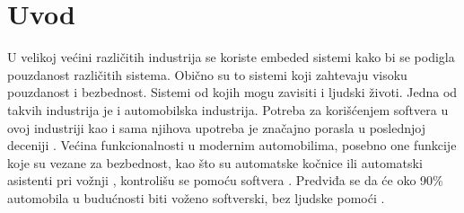 \documentclass{article}
\begin{document}
\section{Uvod}

U velikoj većini različitih industrija se koriste embeded sistemi kako bi se podigla pouzdanost različitih sistema. Obično su to sistemi koji zahtevaju visoku pouzdanost i bezbednost. Sistemi od kojih mogu zavisiti i ljudski životi. Jedna od takvih industrija je i automobilska industrija. Potreba za korišćenjem softvera u ovoj industriji kao i sama njihova upotreba je značajno porasla u poslednjoj deceniji \cite{knjiga1}\cite{knjiga2}. Većina funkcionalnosti u modernim automobilima, posebno one funkcije koje su vezane za bezbednost, kao što su automatske kočnice ili automatski asistenti pri vožnji \cite{knjiga3}, kontrolišu se pomoću softvera \cite{knjiga4}. Predviđa se da će oko 90\% automobila u budućnosti biti voženo softverski, bez ljudske pomoći \cite{knjiga2}.
\end{document}
